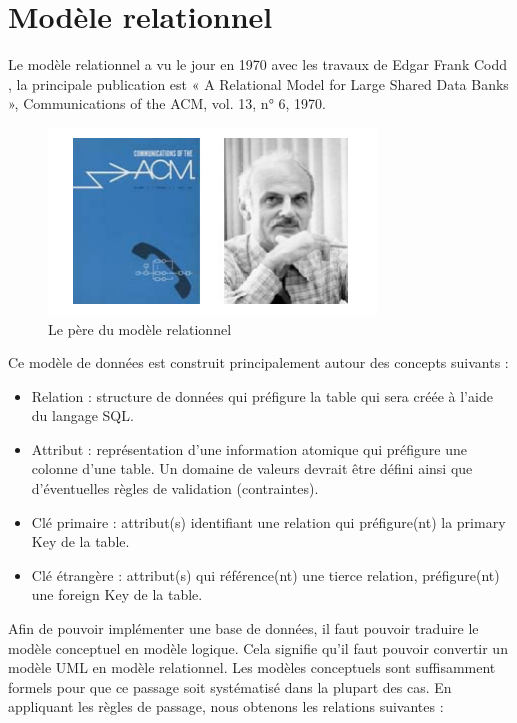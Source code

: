 \section{Modèle relationnel}
Le modèle relationnel a vu le jour en 1970 avec les travaux de Edgar Frank Codd , la principale
publication est « A Relational Model for Large Shared Data Banks », Communications of the
ACM, vol. 13, n° 6, 1970.\\
        \begin{figure}[h!]
                 \centering
                 \includegraphics[scale=1]{images/pere_mr.PNG}
                 \caption{Le père du modèle relationnel}
                 \label{fig48}
        \end{figure}
        
Ce modèle de données est construit principalement autour des concepts suivants \cite{11}:
        \begin{itemize}
            \item[\textbullet] Relation : structure de données qui préfigure la table qui sera créée à l’aide du langage SQL.
            \item[\textbullet]  Attribut  : représentation d’une information atomique qui préfigure une colonne d’une table. Un domaine de valeurs devrait être défini ainsi que d’éventuelles règles de validation (contraintes).
            \item[\textbullet] Clé primaire : attribut(s) identifiant une relation qui préfigure(nt) la primary Key de la table.
            \item[\textbullet] Clé étrangère : attribut(s) qui référence(nt) une tierce relation, préfigure(nt) une foreign Key de la table.             
        \end{itemize}
Afin de pouvoir implémenter une base de données, il faut pouvoir traduire le modèle conceptuel en modèle logique. Cela signifie qu’il faut pouvoir convertir un modèle UML en modèle relationnel. Les modèles conceptuels sont suffisamment formels pour que ce passage soit systématisé dans la plupart des cas. En appliquant les règles de passage\cite{12}, nous obtenons les relations suivantes :

